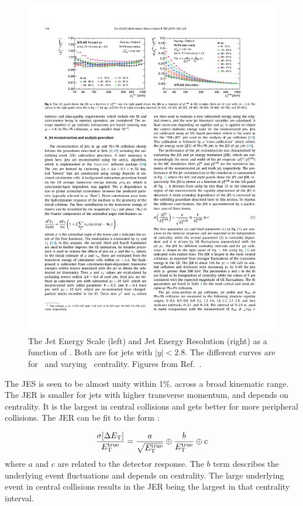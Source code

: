 \begin{figure}[htbp!]
	\centering
	\includegraphics[width=\textwidth]{figures/setup/jes_jer} %
	\caption{
	The Jet Energy Scale (left) and Jet Energy Resolution (right) as a function of \pttruth.
	Both are for jets with $|y| < 2.8$. The different curves are for \pp\ and varying \pbpb\ centrality.
	Figures from Ref.~\cite{2019108}.}	
	\label{fig:jes_jer}%
\end{figure}
The JES is seen to be almost unity within 1\%. across a broad kinematic range.
The JER is smaller for jets with higher transverse momentum, and depends on centrality.
It is the largest in central collisions and gets better for more peripheral collisions.
The JER can be fit to the form \cite{2013220}:

\begin{align}
\frac{\sigma[\Delta \mbox{$E_{\mathrm{T}}$}]}{E_{\rm T}^{\rm true}} = \frac{a}{\sqrt{E_{\rm T}^{\rm true}}} \oplus \frac{b}{E_{\rm T}^{\rm true}} \oplus c
\end{align}
where $a$ and $c$ are related to the detector response.
The $b$ term describes the underlying event fluctuations and depends on centrality.
The large underlying event in central collisions results in the JER being the largest in that centrality interval. 

